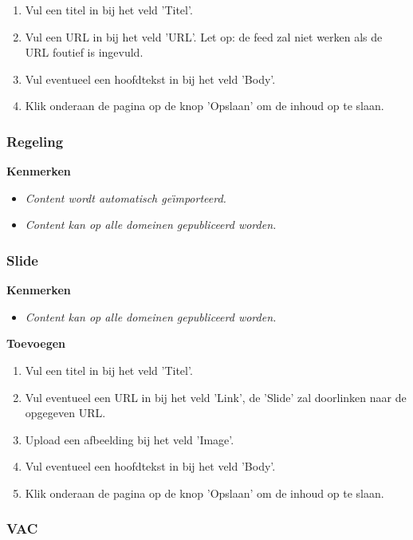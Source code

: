 \begin{enumerate}
\item Vul een titel in bij het veld 'Titel'.
\item Vul een URL in bij het veld 'URL'. Let op: de feed zal niet werken als de URL foutief is ingevuld.
\item Vul eventueel een hoofdtekst in bij het veld 'Body'.
\item Klik onderaan de pagina op de knop 'Opslaan' om de inhoud op te slaan.
\end{enumerate}

\subsubsection{Regeling}\label{regeling}

\textbf{Kenmerken}

\begin{itemize}
\item \emph{Content wordt automatisch ge{\"\i}mporteerd.}
\item \emph{Content kan op alle domeinen gepubliceerd worden.}
\end{itemize}

\subsubsection{Slide}\label{slide}

\textbf{Kenmerken}

\begin{itemize}
\item \emph{Content kan op alle domeinen gepubliceerd worden.}
\end{itemize}

\textbf{Toevoegen}

\begin{enumerate}
\item Vul een titel in bij het veld 'Titel'.
\item Vul eventueel een URL in bij het veld 'Link', de 'Slide' zal doorlinken naar de opgegeven URL.
\item Upload een afbeelding bij het veld 'Image'.
\item Vul eventueel een hoofdtekst in bij het veld 'Body'.
\item Klik onderaan de pagina op de knop 'Opslaan' om de inhoud op te slaan.
\end{enumerate}

\subsubsection{VAC}\label{vac}

